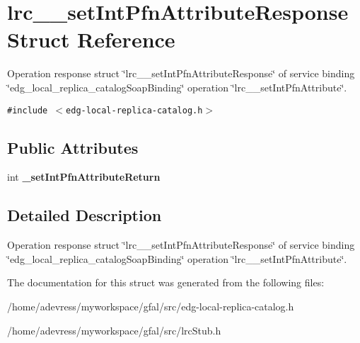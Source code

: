 \section{lrc\_\-\_\-set\-Int\-Pfn\-Attribute\-Response Struct Reference}
\label{structlrc____setIntPfnAttributeResponse}
Operation response struct \char`\"{}lrc\_\-\_\-set\-Int\-Pfn\-Attribute\-Response\char`\"{} of service binding \char`\"{}edg\_\-local\_\-replica\_\-catalog\-Soap\-Binding\char`\"{} operation \char`\"{}lrc\_\-\_\-set\-Int\-Pfn\-Attribute\char`\"{}.  


{\tt \#include $<$edg-local-replica-catalog.h$>$}

\subsection*{Public Attributes}
\begin{CompactItemize}
\item 
int \textbf{\_\-set\-Int\-Pfn\-Attribute\-Return}\label{structlrc____setIntPfnAttributeResponse_72f32b21645465bf65607e8cd685f63f}

\end{CompactItemize}


\subsection{Detailed Description}
Operation response struct \char`\"{}lrc\_\-\_\-set\-Int\-Pfn\-Attribute\-Response\char`\"{} of service binding \char`\"{}edg\_\-local\_\-replica\_\-catalog\-Soap\-Binding\char`\"{} operation \char`\"{}lrc\_\-\_\-set\-Int\-Pfn\-Attribute\char`\"{}. 



The documentation for this struct was generated from the following files:\begin{CompactItemize}
\item 
/home/adevress/myworkspace/gfal/src/edg-local-replica-catalog.h\item 
/home/adevress/myworkspace/gfal/src/lrc\-Stub.h\end{CompactItemize}
